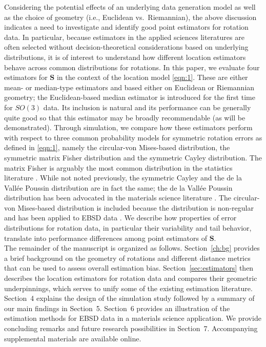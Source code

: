 \noindent Considering the potential effects of an underlying data generation model as well as the choice of geometry (i.e., Euclidean vs.~Riemannian), the above discussion indicates a need to investigate and identify good point estimators for rotation data.  In particular, because estimators in the applied sciences literatures  are often selected without decision-theoretical considerations based on underlying distributions, it is of interest to understand how different location estimators behave across common distributions for rotations.  In this paper, we evaluate four estimators for $\bm S$ in the context of the location model \eqref{eqn:1}. These are either mean- or median-type estimators and based either on Euclidean or Riemannian geometry; the Euclidean-based median estimator is introduced for the first time for $SO(3)$ data. Its inclusion is natural and its performance can be generally quite good so that this estimator may be broadly recommendable (as will be demonstrated).   Through simulation, we compare how these estimators perform with respect to three common probability models for symmetric rotation errors as defined in \eqref{eqn:1}, namely the circular-von Mises-based distribution, the symmetric matrix Fisher distribution and the symmetric Cayley distribution.  The matrix Fisher is arguably the most common distribution in the statistics literature \citep[see][]{chikuse03}. While not noted previously, the symmetric Cayley and the de la Vall\'{e}e Poussin distribution are in fact the same; the de la Vall\'{e}e Poussin distribution has been advocated in the materials science literature \citep{Schaeben97}.   The circular-von Mises-based distribution is included because the distribution is non-regular and has been applied to EBSD data \citep{bingham09}.  We describe how properties of error distributions for rotation data, in particular their variability and tail behavior, translate into performance differences among point estimators of $\bm S$.\\
The remainder of the manuscript is organized  as follows.  Section~\ref{ch:bg} provides a brief background on the geometry of rotations and different distance metrics that can be used to assess overall estimation bias.   Section~\ref{sec:estimators} then describes the location estimators for rotation data  and compares their geometric underpinnings, which  serves to unify some of the existing estimation literature.  Section~4 explains the design of the simulation study followed by a summary of our main findings in Section~5. Section~6 provides an illustration of the estimation methods for EBSD data in a materials science application. We provide concluding remarks and future research possibilities in Section~7. Accompanying supplemental materials are available online.
